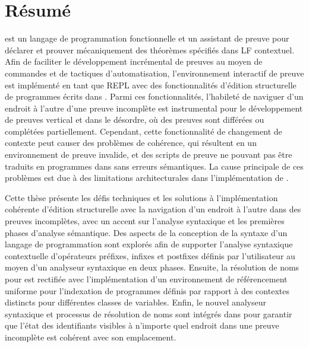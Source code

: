 
\chapter*{Résumé}

\Beluga est un langage de programmation fonctionnelle et un assistant de preuve pour déclarer et prouver mécaniquement des théorèmes spécifiés dans \acs{LF} contextuel.
Afin de faciliter le développement incrémental de preuves au moyen de commandes et de tactiques d'automatisation, l'environnement interactif de preuve \Harpoon est implémenté en tant que \acs{REPL} avec des fonctionnalités d'édition structurelle de programmes écrits dans \Beluga.
Parmi ces fonctionnalités, l'habileté de naviguer d'un endroit à l'autre d'une preuve incomplète est instrumental pour le développement de preuves vertical et dans le désordre, où des preuves sont différées ou complétées partiellement.
Cependant, cette fonctionnalité de changement de contexte peut causer des problèmes de cohérence, qui résultent en un environnement de preuve invalide, et des scripts de preuve ne pouvant pas être traduits en programmes dans \Beluga sans erreurs sémantiques.
La cause principale de ces problèmes est due à des limitations architecturales dans l'implémentation de \Beluga.

Cette thèse présente les défis techniques et les solutions à l'implémentation cohérente d'édition structurelle avec la navigation d'un endroit à l'autre dans des preuves incomplètes, avec un accent sur l'analyse syntaxique et les premières phases d'analyse sémantique.
Des aspects de la conception de la syntaxe d'un langage de programmation sont explorés afin de supporter l'analyse syntaxique contextuelle d'opérateurs préfixes, infixes et postfixes définis par l'utilisateur au moyen d'un analyseur syntaxique en deux phases.
Ensuite, la résolution de noms pour \Beluga est rectifiée avec l'implémentation d'un environnement de référencement uniforme pour l'indexation de programmes définis par rapport à des contextes distincts pour différentes classes de variables.
Enfin, le nouvel analyseur syntaxique et processus de résolution de noms sont intégrés dans \Harpoon pour garantir que l'état des identifiants visibles à n'importe quel endroit dans une preuve incomplète est cohérent avec son emplacement.

